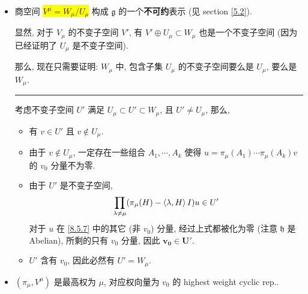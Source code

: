 \begin{itemize}
	\noindent\rule[0.5ex]{\linewidth}{0.5pt} %
	
	\item 商空间 \colorbox{yellow}{$V^\mu = W_\mu / U_\mu$} 构成 $\mathfrak{g}$ 的一个\textbf{不可约}表示 (见 section \ref{5.2}).
	
	\begin{tcolorbox}[title=proof:]
		显然, 对于 $V_\mu$ 的不变子空间 $V'$, 有 $V' \oplus U_\mu \subset W_\mu$ 也是一个不变子空间 (因为已经证明了 $U_\mu$ 是不变子空间).
		
		那么, 现在只需要证明: $W_\mu$ 中, 包含子集 $U_\mu$ 的不变子空间要么是 $U_\mu$, 要么是 $W_\mu$.
		
		\noindent\rule[0.5ex]{\linewidth}{0.5pt} %
		
		考虑不变子空间 $U'$ 满足 $U_\mu \subset U' \subset W_\mu$, 且 $U' \neq U_\mu$, 那么,
		\begin{itemize}
			\item 有 $v \in U'$ 且 $v \notin U_\mu$.
			
			\item 由于 $v \notin U_\mu$, 一定存在一些组合 $A_1, \cdots, A_k$ 使得 $u = \pi_\mu(A_1) \cdots \pi_\mu(A_k) v$ 的 $v_0$ 分量不为零.
			
			\item 由于 $U'$ 是不变子空间,
			\begin{equation}
				\prod_{\lambda \neq \mu} (\pi_\mu(H) - \braket{\lambda, H} I) u \in U'
			\end{equation}
			对于 $u$ 在 \eqref{8.5.7} 中的其它 (非 $v_0$) 分量, 经过上式都被化为零 (注意 $\mathfrak{h}$ 是 Abelian), 所剩的只有 $v_0$ 分量, 因此 $\boldsymbol{v_0 \in U'}$.
			
			\item $U'$ 含有 $v_0$, 因此必然有 $U' = W_\mu$.
		\end{itemize}
	\end{tcolorbox}
	
	\item $(\pi_\mu, V^\mu)$ 是最高权为 $\mu$, 对应权向量为 $v_0$ 的 highest weight cyclic rep..
	
	\noindent\hdashrule[0.5ex]{\linewidth}{0.5pt}{1mm} %
	

\end{itemize}
